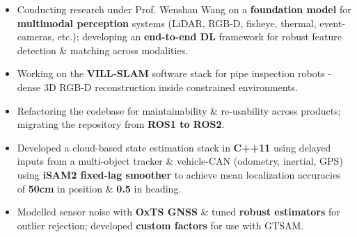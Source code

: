 


{
\begin{itemize}
        \item Conducting research under Prof. Wenshan Wang on a \textbf{foundation model} for \textbf{multimodal perception} systems (LiDAR, RGB-D, fisheye, thermal, event-cameras, etc.); developing an \textbf{end-to-end DL} framework for robust feature detection \& matching across modalities.
    \end{itemize}
}

{
    \begin{itemize}
        \item Working on the \textbf{VILL-SLAM} software stack for pipe inspection robots - dense 3D RGB-D reconstruction inside constrained environments.
        \item Refactoring the codebase for maintainability \& re-usability across products; migrating the repository from \textbf{ROS1 to ROS2}.
    \end{itemize}
}


{
\begin{itemize}
        \item Developed a cloud-based state estimation stack in \textbf{C++11} using delayed inputs from a multi-object tracker \& vehicle-CAN (odometry, inertial, GPS) using \textbf{iSAM2 fixed-lag smoother} to achieve mean localization accuracies of \textbf{50cm} in position \& \textbf{0.5\degree} in heading.
        \item Modelled sensor noise with \textbf{OxTS GNSS} \& tuned \textbf{robust estimators} for outlier rejection; developed \textbf{custom factors} for use with GTSAM.
    \end{itemize}
}


